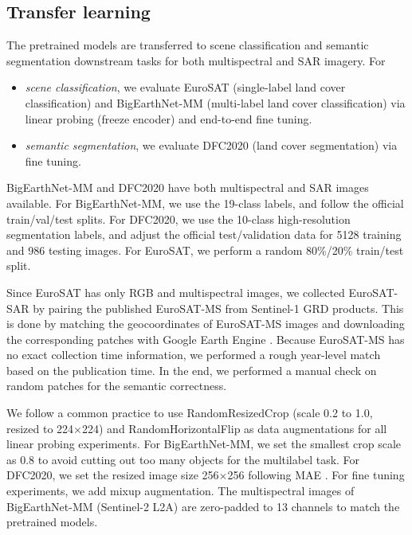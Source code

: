 \documentclass[lettersize,journal]{IEEEtran}
\begin{document}
\subsection{Transfer learning} 

\hspace{0.3em}
The pretrained models are transferred to scene classification and semantic segmentation downstream tasks for both multispectral and SAR imagery. For
\begin{itemize}
    \item \textit{scene classification}, we evaluate EuroSAT \citep{helber2019eurosat} (single-label land cover classification) and BigEarthNet-MM \citep{sumbul2021bigearthnet} (multi-label land cover classification) via linear probing (freeze encoder) and end-to-end fine tuning.
    \item \textit{semantic segmentation}, we evaluate DFC2020 \citep{schmitt2020ieee} (land cover segmentation) via fine tuning.
\end{itemize}

BigEarthNet-MM and DFC2020 have both multispectral and SAR images available. For BigEarthNet-MM, we use the 19-class labels, and follow the official train/val/test splits. For DFC2020, we use the 10-class high-resolution segmentation labels, and adjust the official test/validation data for 5128 training and 986 testing images. For EuroSAT, we perform a random 80\%/20\% train/test split.

Since EuroSAT has only RGB and multispectral images, we collected EuroSAT-SAR by pairing the published EuroSAT-MS from Sentinel-1 GRD products. This is done by matching the geocoordinates of EuroSAT-MS images and downloading the corresponding patches with Google Earth Engine \cite{gorelick2017google}. Because EuroSAT-MS has no exact collection time information, we performed a rough year-level match based on the publication time. In the end, we performed a manual check on random patches for the semantic correctness.


\vspace{0.5em}
\hspace{0.3em}
We follow a common practice to use RandomResizedCrop (scale 0.2 to 1.0, resized to 224$\times$224) and RandomHorizontalFlip as data augmentations for all linear probing experiments. For BigEarthNet-MM, we set the smallest crop scale as 0.8 to avoid cutting out too many objects for the multilabel task. For DFC2020, we set the resized image size 256$\times$256 following MAE \cite{he2022masked}. For fine tuning experiments, we add mixup \cite{zhang2018mixup} augmentation. The multispectral images of BigEarthNet-MM (Sentinel-2 L2A) are zero-padded to 13 channels to match the pretrained models.
\end{document}
